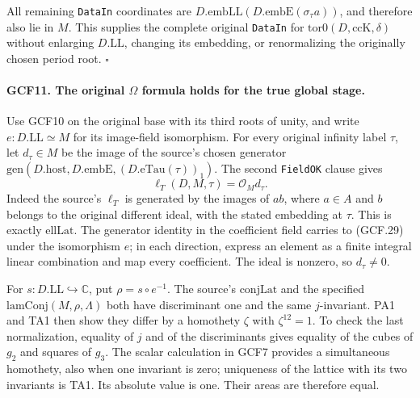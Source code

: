 All remaining \texttt{DataIn} coordinates are
\(D.\mathrm{embLL}(D.\mathrm{embE}(\sigma_\tau a))\), and
therefore also lie in \(M\).  This supplies the complete original
\texttt{DataIn} for \(\mathrm{tor0}(D,\mathrm{ccK},\delta)\)
without enlarging \(D.\mathrm{LL}\), changing its embedding, or
renormalizing the originally chosen period root.
\hfill\(\square\)

\paragraph{GCF11. The original \(\Omega\) formula holds for the true global stage.}
\label{claim:GCF11}
Use GCF10 on the original base with its third roots of unity, and
write \(e:D.\mathrm{LL}\simeq M\) for its image-field isomorphism.
For every original infinity label \(\tau\), let \(d_\tau\in M\)
be the image of the source's chosen generator
\(\mathrm{gen}(D.\mathrm{host},D.\mathrm{embE},(D.\mathrm{eTau}(\tau))_1)\).
The second \texttt{FieldOK} clause gives
\[
                 \ell_T(D,M,\tau)=\mathcal O_Md_\tau.
 \tag{GCF.29}
\]
Indeed the source's \(\ell_T\) is generated by the images of
\(a b\), where \(a\in A\) and \(b\) belongs to the original
different ideal, with the stated embedding at \(\tau\).
This is exactly \(\mathrm{ellLat}\).  The generator identity in
the coefficient field carries to (GCF.29) under the isomorphism
\(e\); in each direction, express an element as a finite integral
linear combination and map every coefficient.  The ideal is nonzero,
so \(d_\tau\ne0\).

For \(s:D.\mathrm{LL}\hookrightarrow\mathbb C\), put
\(\rho=s\circ e^{-1}\).  The source's \(\mathrm{conjLat}\)
and the specified \(\mathrm{lamConj}(M,\rho,\Lambda)\) both
have discriminant one and the same \(j\)-invariant.  PA1 and TA1
then show they differ by a homothety \(\zeta\) with
\(\zeta^{12}=1\).  To check the last normalization, equality of
\(j\) and of the discriminants gives equality of the cubes of
\(g_2\) and squares of \(g_3\).  The scalar calculation in GCF7
provides a simultaneous homothety, also when one invariant is zero;
uniqueness of the lattice with its two invariants is TA1.
Its absolute value is one.  Their areas are therefore equal.

